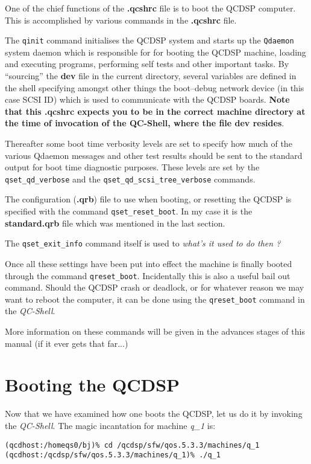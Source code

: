 One of the chief functions of the {\bf .qcshrc} file is to boot the 
QCDSP computer. This is accomplished by various commands in the 
{\bf .qcshrc} file. 

The {\tt qinit} command initialises the QCDSP system and starts up
the {\tt Qdaemon} system daemon which is responsible for for booting
the QCDSP machine, loading and executing programs, performing self tests
and other important tasks.  By ``sourcing''
the {\bf dev} file in the current directory, several variables are 
defined in the shell specifying amongst other things the boot--debug
network device (in this case SCSI ID) which is used to communicate
with the QCDSP boards. {\bf Note that this .qcshrc expects you to be
in the correct machine directory at the time of invocation of the 
QC-Shell, where the file dev resides}.

Thereafter some boot time verbosity levels are set to specify how 
much of the various Qdaemon messages and other test results should be sent
to the standard output for boot time diagnostic purposes. These levels 
are set by the {\tt qset\_qd\_verbose} and the 
{\tt qset\_qd\_scsi\_tree\_verbose} 
commands.

The configuration ({\bf .qrb}) file to use when booting, or resetting
the QCDSP is specified with the command {\tt qset\_reset\_boot}. In
my case it is the {\bf standard.qrb} file which was mentioned in the
last section. 

The {\tt qset\_exit\_info} command itself is used to {\em what's it 
used to do then ?} 

Once all these settings have been put into effect the machine is 
finally booted through the command {\tt qreset\_boot}. Incidentally
this is also a useful bail out command. Should the QCDSP crash or deadlock,
or for whatever reason we may want to reboot the computer, it can be 
done using the {\tt qreset\_boot} command in the {\em QC-Shell}.

More information on these commands will be given in the
advances stages of this manual (if it ever gets that far...)

\section{Booting the QCDSP}
Now that we have examined how one boots the QCDSP, let us do it
by invoking the {\em QC-Shell}. The magic incantation for machine {\em q\_1}
is:
\begin{verbatim}
(qcdhost:/homeqs0/bj)% cd /qcdsp/sfw/qos.5.3.3/machines/q_1
(qcdhost:/qcdsp/sfw/qos.5.3.3/machines/q_1)% ./q_1
\end{verbatim}

